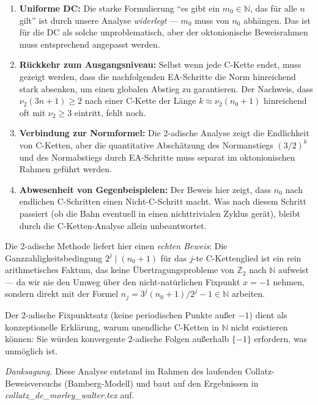 \documentclass[12pt,a4paper]{article}
\newcommand{\vii}{\nu_2}
\newcommand{\N}{\mathbb{N}}
\newcommand{\Ztwo}{\mathbb{Z}_2}     %
\begin{document}
\begin{tcolorbox}[lücke, title={Was noch fehlt für den vollen Beweis}]
\begin{enumerate}[label=(\arabic*)]
  \item \textbf{Uniforme DC:} Die starke Formulierung
    ``es gibt ein $m_0 \in \N$, das für alle $n$ gilt''
    ist durch unsere Analyse \emph{widerlegt} --- $m_0$ muss von $n_0$
    abhängen. Das ist für die DC als solche unproblematisch, aber der
    oktonionische Beweisrahmen muss entsprechend angepasst werden.

  \item \textbf{Rückkehr zum Ausgangsniveau:} Selbst wenn jede C-Kette
    endet, muss gezeigt werden, dass die nachfolgenden EA-Schritte
    die Norm hinreichend stark absenken, um einen globalen Abstieg zu
    garantieren. Der Nachweis, dass $\vii(3n+1) \geq 2$ nach einer
    C-Kette der Länge $k \approx \vii(n_0+1)$ hinreichend oft mit
    $\vii \geq 3$ eintritt, fehlt noch.

  \item \textbf{Verbindung zur Normformel:} Die 2-adische Analyse zeigt
    die Endlichkeit von C-Ketten, aber die quantitative Abschätzung des
    Normanstiegs $(3/2)^k$ und des Normabstiegs durch EA-Schritte
    muss separat im oktonionischen Rahmen geführt werden.

  \item \textbf{Abwesenheit von Gegenbeispielen:} Der Beweis hier
    zeigt, dass $n_0$ nach endlichen C-Schritten einen Nicht-C-Schritt
    macht. Was nach diesem Schritt passiert (ob die Bahn eventuell in
    einen nichttrivialen Zyklus gerät), bleibt durch die C-Ketten-Analyse
    allein unbeantwortet.
\end{enumerate}
\end{tcolorbox}

\begin{tcolorbox}[adisch, title={Abschließende 2-adische Einordnung}]
Die 2-adische Methode liefert hier einen \emph{echten Beweis}:
Die Ganzzahligkeitsbedingung $2^j \mid (n_0+1)$ für das $j$-te C-Kettenglied
ist ein rein arithmetisches Faktum, das keine Übertragungsprobleme von
$\Ztwo$ nach $\N$ aufweist --- da wir nie den Umweg über den nicht-natürlichen
Fixpunkt $x = -1$ nehmen, sondern direkt mit der Formel
$n_j = 3^j(n_0+1)/2^j - 1 \in \N$ arbeiten.

Der 2-adische Fixpunktsatz (keine periodischen Punkte außer $-1$) dient
als konzeptionelle Erklärung, warum unendliche C-Ketten in $\N$ nicht
existieren können: Sie würden konvergente 2-adische Folgen außerhalb $\{-1\}$
erfordern, was unmöglich ist.
\end{tcolorbox}

\bigskip
\noindent\textit{Danksagung.} Diese Analyse entstand im Rahmen des laufenden
Collatz-Beweisversuchs (Bamberg-Modell) und baut auf den Ergebnissen in
\textit{collatz\_dc\_morley\_walter.tex} auf.
\end{document}
